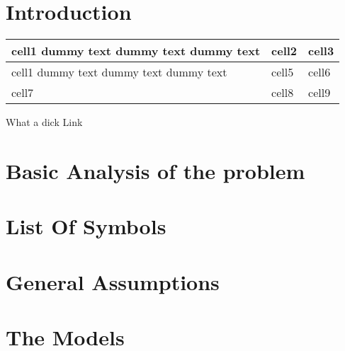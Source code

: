 \documentclass{mcmthesis}
\title{}
\date{\today}
\begin{document}






\tableofcontents
\newpage




\section{Introduction}

  \begin{center}
  \begin{tabular}{ | m{5em} | m{1cm}| m{2cm} | } 
    \hline
    cell1 dummy text dummy text dummy text& cell2 & cell3 \\ 
    \hline
    cell1 dummy text dummy text dummy text & cell5 & cell6 \\ 
    \hline
    cell7 & cell8 & cell9 \\ 
    \hline
  \end{tabular}
  \end{center}

  
What a dick\cite{yaggi2006sleep}
Link\cite{WinNT}
\section{Basic Analysis of the problem}
  

\section{List Of Symbols}
  

\section{General Assumptions}
  

\section{The Models}
  
\end{document}
